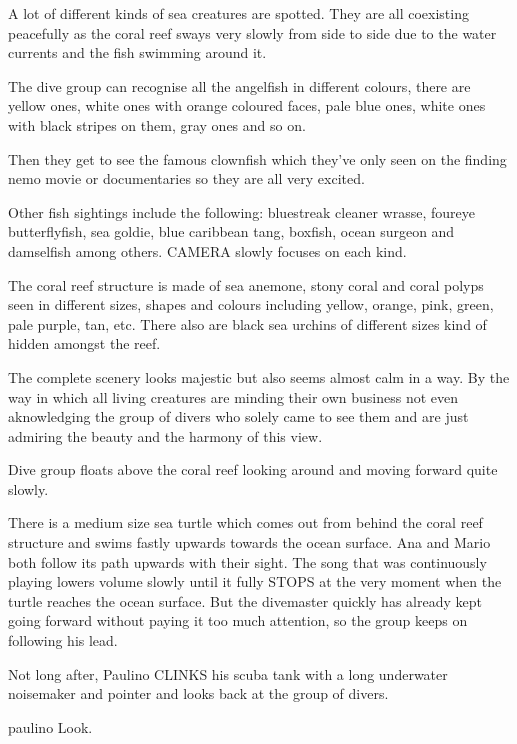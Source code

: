 \documentclass{screenplay}
\begin{document}
A lot of different kinds of sea creatures are spotted. They are all coexisting peacefully as the coral reef sways very slowly from side to side due to the water currents and the fish swimming around it.

The dive group can recognise all the angelfish in different colours, there are yellow ones, white ones with orange coloured faces, pale blue ones, white ones with black stripes on them, gray ones and so on.

Then they get to see the famous clownfish which they've only seen on the finding nemo movie or documentaries so they are all very excited.

Other fish sightings include the following: bluestreak cleaner wrasse, foureye butterflyfish, sea goldie, blue caribbean tang, boxfish, ocean surgeon and damselfish among others. CAMERA slowly focuses on each kind.

The coral reef structure is made of sea anemone, stony coral and coral polyps seen in different sizes, shapes and colours including yellow, orange, pink, green, pale purple, tan, etc. There also are black sea urchins of different sizes kind of hidden amongst the reef.

The complete scenery looks majestic but also seems almost calm in a way. By the way in which all living creatures are minding their own business not even aknowledging the group of divers who solely came to see them and are just admiring the beauty and the harmony of this view.

Dive group floats above the coral reef looking around and moving forward quite slowly.

There is a medium size sea turtle which comes out from behind the coral reef structure and swims fastly upwards towards the ocean surface. Ana and Mario both follow its path upwards with their sight. The song that was continuously playing lowers volume slowly until it fully STOPS at the very moment when the turtle reaches the ocean surface. But the divemaster quickly has already kept going forward without paying it too much attention, so the group keeps on following his lead.

\pagebreak

Not long after, Paulino CLINKS his scuba tank with a long underwater noisemaker and pointer and looks back at the group of divers.

\begin{dialogue}{paulino}
Look.
\end{dialogue}
\end{document}
